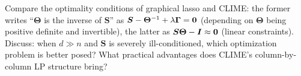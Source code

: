 \begin{exercise}\label{ex:glasso-clime}
Compare the optimality conditions of graphical lasso and CLIME: the former writes ``$\bm{\Theta}$ is the inverse of $\bm{S}$'' as $\bm{S} - \bm{\Theta}^{-1} + \lambda\bm{\Gamma} = \mathbf{0}$ (depending on $\bm{\Theta}$ being positive definite and invertible), the latter as $\bm{S}\bm{\Theta} - \bm{I} \approx \mathbf{0}$ (linear constraints). Discuss: when $d \gg n$ and $\bm{S}$ is severely ill-conditioned, which optimization problem is better posed? What practical advantages does CLIME's column-by-column LP structure bring?
\end{exercise}
